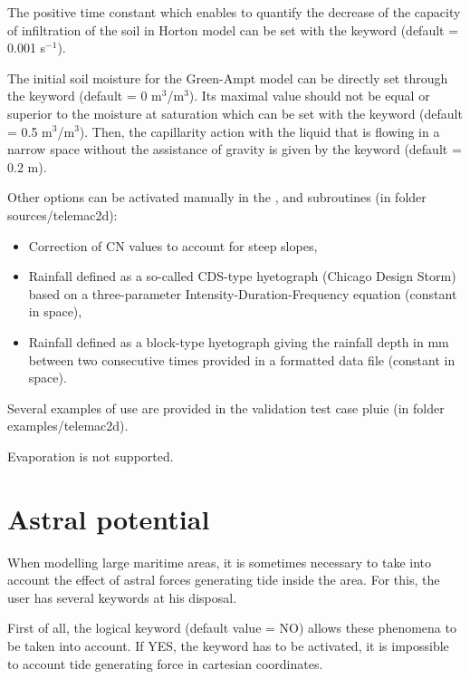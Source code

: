 The positive time constant which enables to quantify the decrease
of the capacity of infiltration of the soil in Horton model can be set
with the keyword  (default = 0.001 s$^{-1}$).

The initial soil moisture for the Green-Ampt model can be directly set
through the keyword  (default = 0 m$^3$/m$^3$).
Its maximal value should not be equal or superior to the moisture at
saturation which can be set with the keyword
 (default = 0.5 m$^3$/m$^3$).
Then, the capillarity action
with the liquid that is flowing in a narrow space without the assistance
of gravity is given by the keyword  (default = 0.2 m).

Other options can be activated manually in the ,
 and 
subroutines (in folder sources/telemac2d):
\begin{itemize}
\item Correction of CN values to account for steep slopes,
\item Rainfall defined as a so-called CDS-type hyetograph (Chicago Design
Storm) based on a three-parameter Intensity-Duration-Frequency equation
(constant in space),
\item Rainfall defined as a block-type hyetograph giving the rainfall depth
in mm between two consecutive times provided in a formatted data file (constant
in space).
\end{itemize}

Several examples of use are provided in the validation test case pluie
(in folder examples/telemac2d).

Evaporation is not supported.


\section{Astral potential}
\label{sec:astral:pot}
When modelling large maritime areas, it is sometimes necessary to take into
account the effect of astral forces generating tide inside the area.
For this, the user has several keywords at his disposal.

First of all, the logical keyword 
(default value = NO) allows these phenomena to be taken into account.
If YES, the keyword  has to be activated,
it is impossible to account tide generating force in cartesian coordinates.

